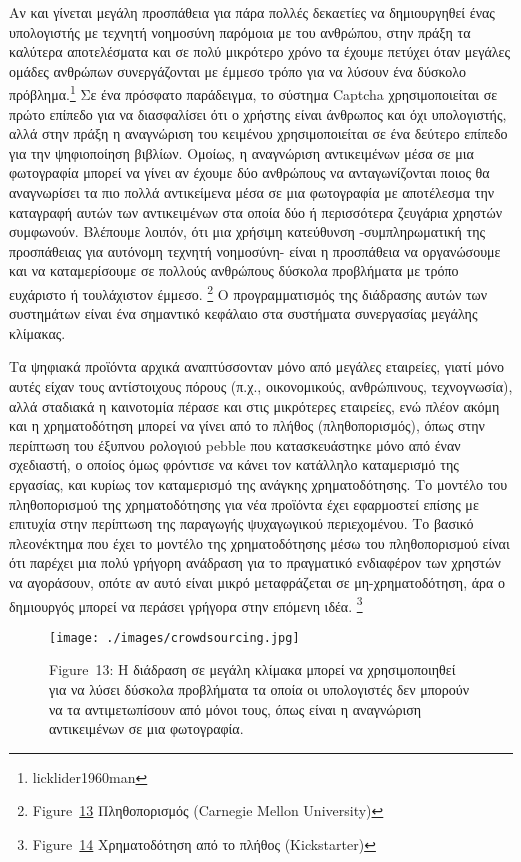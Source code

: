 \documentclass[
]{article}
\begin{document}
Αν και γίνεται μεγάλη προσπάθεια για πάρα πολλές δεκαετίες να
δημιουργηθεί ένας υπολογιστής με τεχνητή νοημοσύνη παρόμοια με του
ανθρώπου, στην πράξη τα καλύτερα αποτελέσματα και σε πολύ μικρότερο
χρόνο τα έχουμε πετύχει όταν μεγάλες ομάδες ανθρώπων συνεργάζονται με
έμμεσο τρόπο για να λύσουν ένα δύσκολο πρόβλημα.\footnote{licklider1960man}
Σε ένα πρόσφατο παράδειγμα, το σύστημα Captcha χρησιμοποιείται σε πρώτο
επίπεδο για να διασφαλίσει ότι ο χρήστης είναι άνθρωπος και όχι
υπολογιστής, αλλά στην πράξη η αναγνώριση του κειμένου χρησιμοποιείται
σε ένα δεύτερο επίπεδο για την ψηφιοποίηση βιβλίων. Ομοίως, η αναγνώριση
αντικειμένων μέσα σε μια φωτογραφία μπορεί να γίνει αν έχουμε δύο
ανθρώπους να ανταγωνίζονται ποιος θα αναγνωρίσει τα πιο πολλά
αντικείμενα μέσα σε μια φωτογραφία με αποτέλεσμα την καταγραφή αυτών των
αντικειμένων στα οποία δύο ή περισσότερα ζευγάρια χρηστών συμφωνούν.
Βλέπουμε λοιπόν, ότι μια χρήσιμη κατεύθυνση -συμπληρωματική της
προσπάθειας για αυτόνομη τεχνητή νοημοσύνη- είναι η προσπάθεια να
οργανώσουμε και να καταμερίσουμε σε πολλούς ανθρώπους δύσκολα προβλήματα
με τρόπο ευχάριστο ή τουλάχιστον έμμεσο. \footnote{Figure~\protect\hyperlink{fig:crowdsourcing}{13}
  Πληθοπορισμός (Carnegie Mellon University)} Ο προγραμματισμός της
διάδρασης αυτών των συστημάτων είναι ένα σημαντικό κεφάλαιο στα
συστήματα συνεργασίας μεγάλης κλίμακας.

Τα ψηφιακά προϊόντα αρχικά αναπτύσσονταν μόνο από μεγάλες εταιρείες,
γιατί μόνο αυτές είχαν τους αντίστοιχους πόρους (π.χ., οικονομικούς,
ανθρώπινους, τεχνογνωσία), αλλά σταδιακά η καινοτομία πέρασε και στις
μικρότερες εταιρείες, ενώ πλέον ακόμη και η χρηματοδότηση μπορεί να
γίνει από το πλήθος (πληθοπορισμός), όπως στην περίπτωση του έξυπνου
ρολογιού pebble που κατασκευάστηκε μόνο από έναν σχεδιαστή, ο οποίος
όμως φρόντισε να κάνει τον κατάλληλο καταμερισμό της εργασίας, και
κυρίως τον καταμερισμό της ανάγκης χρηματοδότησης. Το μοντέλο του
πληθοπορισμού της χρηματοδότησης για νέα προϊόντα έχει εφαρμοστεί επίσης
με επιτυχία στην περίπτωση της παραγωγής ψυχαγωγικού περιεχομένου. Το
βασικό πλεονέκτημα που έχει το μοντέλο της χρηματοδότησης μέσω του
πληθοπορισμού είναι ότι παρέχει μια πολύ γρήγορη ανάδραση για το
πραγματικό ενδιαφέρον των χρηστών να αγοράσουν, οπότε αν αυτό είναι
μικρό μεταφράζεται σε μη-χρηματοδότηση, άρα ο δημιουργός μπορεί να
περάσει γρήγορα στην επόμενη ιδέα. \footnote{Figure~\protect\hyperlink{fig:kickstarter-pebble}{14}
  Χρηματοδότηση από το πλήθος (Kickstarter)}

\leavevmode{}%
\begin{figure}
\hypertarget{fig:crowdsourcing}{%
\centering
\texttt{[image: ./images/crowdsourcing.jpg]}
\caption{Figure~13: Η διάδραση σε μεγάλη κλίμακα μπορεί να
χρησιμοποιηθεί για να λύσει δύσκολα προβλήματα τα οποία οι υπολογιστές
δεν μπορούν να τα αντιμετωπίσουν από μόνοι τους, όπως είναι η αναγνώριση
αντικειμένων σε μια φωτογραφία.}\label{fig:crowdsourcing}
}
\end{figure}
\end{document}
